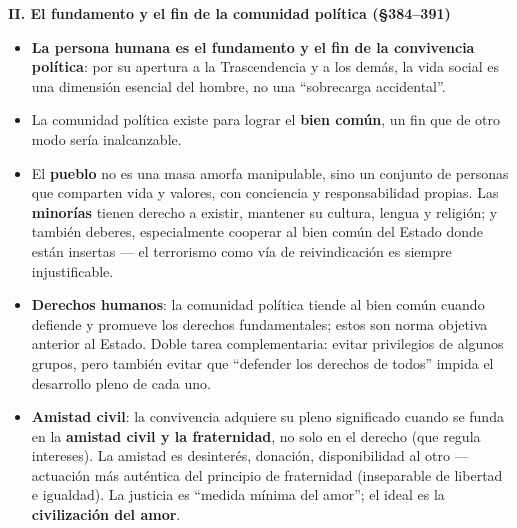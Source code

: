 \documentclass[10pt,a4paper]{article}
\begin{document}
\medskip\noindent \textbf{II. El fundamento y el fin de la comunidad política (\S{}384--391)}\par\nopagebreak
\begin{itemize}
\item \textbf{La persona humana es el fundamento y el fin de la convivencia política}: por su apertura a la Trascendencia y a los demás, la vida social es una dimensión esencial del hombre, no una ``sobrecarga accidental''.
\item La comunidad política existe para lograr el \textbf{bien común}, un fin que de otro modo sería inalcanzable.
\item El \textbf{pueblo} no es una masa amorfa manipulable, sino un conjunto de personas que comparten vida y valores, con conciencia y responsabilidad propias. Las \textbf{minorías} tienen derecho a existir, mantener su cultura, lengua y religión; y también deberes, especialmente cooperar al bien común del Estado donde están insertas --- el terrorismo como vía de reivindicación es siempre injustificable.
\item \textbf{Derechos humanos}: la comunidad política tiende al bien común cuando defiende y promueve los derechos fundamentales; estos son norma objetiva anterior al Estado. Doble tarea complementaria: evitar privilegios de algunos grupos, pero también evitar que ``defender los derechos de todos'' impida el desarrollo pleno de cada uno.
\item \textbf{Amistad civil}: la convivencia adquiere su pleno significado cuando se funda en la \textbf{amistad civil y la fraternidad}, no solo en el derecho (que regula intereses). La amistad es desinterés, donación, disponibilidad al otro --- actuación más auténtica del principio de fraternidad (inseparable de libertad e igualdad). La justicia es ``medida mínima del amor''; el ideal es la \textbf{civilización del amor}.
\end{itemize}
\end{document}
